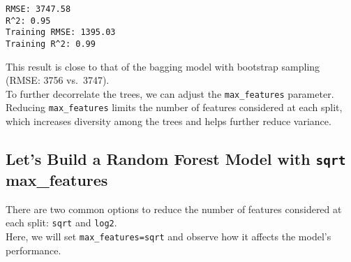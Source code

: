 \documentclass[
  letterpaper,
  DIV=11,
  numbers=noendperiod]{scrreprt}
\begin{document}
\begin{verbatim}
RMSE: 3747.58
R^2: 0.95
Training RMSE: 1395.03
Training R^2: 0.99
\end{verbatim}

This result is close to that of the bagging model with bootstrap
sampling (RMSE: 3756 vs.~3747).\\
To further decorrelate the trees, we can adjust the
\texttt{max\_features} parameter. Reducing \texttt{max\_features} limits
the number of features considered at each split, which increases
diversity among the trees and helps further reduce variance.

\subsection{\texorpdfstring{Let's Build a Random Forest Model with
\texttt{sqrt}
max\_features}{Let's Build a Random Forest Model with sqrt max\_features}}\label{lets-build-a-random-forest-model-with-sqrt-max_features}

There are two common options to reduce the number of features considered
at each split: \texttt{sqrt} and \texttt{log2}.\\
Here, we will set
\texttt{max\_features=\textquotesingle{}sqrt\textquotesingle{}} and
observe how it affects the model's performance.
\end{document}
